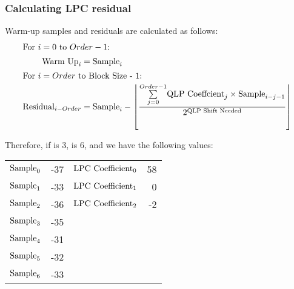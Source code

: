 
\clearpage

\subsubsection{Calculating LPC residual}

Warm-up samples and residuals are calculated as follows:
\begin{align*}
\intertext{For $i = 0$ to $Order - 1$:}
\text{Warm Up}_i &= \text{Sample}_i \\
\intertext{For $i = Order$ to Block Size - 1:}
\text{Residual}_{i - Order} &= \text{Sample}_i -
\left \lfloor \frac{\overset{Order - 1}{\underset{j = 0}{\sum}}
  \text{QLP Coeffcient}_j \times \text{Sample}_{i - j - 1} }{
2 ^ \text{QLP Shift Needed}} \right \rfloor
\end{align*}
\par
\noindent
Therefore, if  is 3,  is 6,
and we have the following values:
\begin{tabular}{r r | r r}
$\text{Sample}_0$ & -37 & $\text{LPC Coefficient}_0$ & 58 \\
$\text{Sample}_1$ & -33 & $\text{LPC Coefficient}_1$ & 0 \\
$\text{Sample}_2$ & -36 & $\text{LPC Coefficient}_2$ & -2 \\
$\text{Sample}_3$ & -35 & & \\
$\text{Sample}_4$ & -31 & & \\
$\text{Sample}_5$ & -32 & & \\
$\text{Sample}_6$ & -33 & & \\
\end{tabular}

\clearpage

